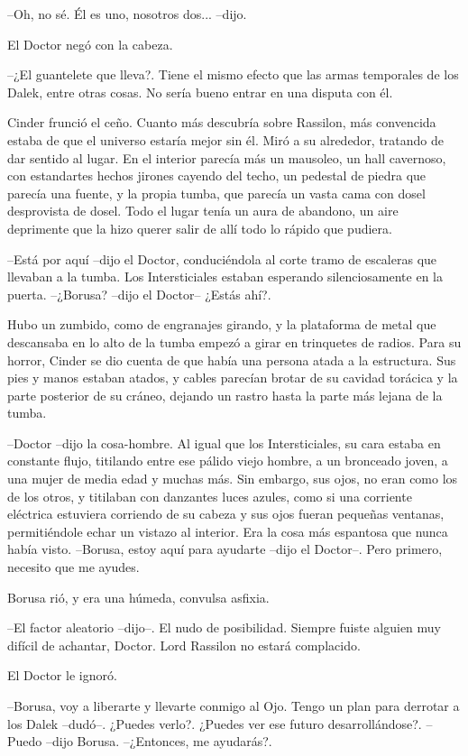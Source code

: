 --Oh, no sé. Él es uno, nosotros dos... --dijo.

El Doctor negó con la cabeza. 

--¿El guantelete que lleva?. Tiene el mismo efecto que las armas temporales de los Dalek, entre otras cosas. No sería bueno entrar en una disputa con él.

Cinder frunció el ceño. Cuanto más descubría sobre Rassilon, más convencida estaba de que el universo estaría mejor sin él.
Miró a su alrededor, tratando de dar sentido al lugar. En el interior parecía más un mausoleo, un hall cavernoso, con estandartes hechos jirones cayendo del techo, un pedestal de piedra que parecía una fuente, y la propia tumba, que parecía un vasta cama con dosel desprovista de dosel.
Todo el lugar tenía un aura de abandono, un aire deprimente que la hizo querer salir de allí todo lo rápido que pudiera.

--Está por aquí --dijo el Doctor, conduciéndola al corte tramo de escaleras que llevaban a la tumba. Los Intersticiales estaban esperando silenciosamente en la puerta.
--¿Borusa? --dijo el Doctor-- ¿Estás ahí?.

Hubo un zumbido, como de engranajes girando, y la plataforma de metal que descansaba en lo alto de la tumba empezó a girar en trinquetes de radios. Para su horror, Cinder se dio cuenta de que había una persona atada a la estructura. Sus pies y manos estaban atados, y cables parecían brotar de su cavidad torácica y la parte posterior de su cráneo, dejando un rastro hasta la parte más lejana de la tumba.

--Doctor --dijo la cosa-hombre. Al igual que los Intersticiales, su cara estaba en constante flujo, titilando entre ese pálido viejo hombre, a un bronceado joven, a una mujer de media edad y muchas más. Sin embargo, sus ojos, no eran como los de los otros, y titilaban con danzantes luces azules, como si una corriente eléctrica estuviera corriendo de su cabeza y sus ojos fueran pequeñas ventanas, permitiéndole echar un vistazo al interior. Era la cosa más espantosa que nunca había visto.
--Borusa, estoy aquí para ayudarte --dijo el Doctor--. Pero primero, necesito que me ayudes.

Borusa rió, y era una húmeda, convulsa asfixia.

--El factor aleatorio --dijo--. El nudo de posibilidad. Siempre fuiste alguien muy difícil de achantar, Doctor. Lord Rassilon no estará complacido.

El Doctor le ignoró. 

--Borusa, voy a liberarte y llevarte conmigo al Ojo. Tengo un plan para derrotar a los Dalek --dudó--. ¿Puedes verlo?. ¿Puedes ver ese futuro desarrollándose?.
--Puedo --dijo Borusa.
--¿Entonces, me ayudarás?.

